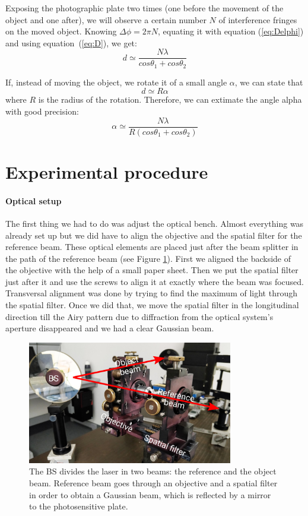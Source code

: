 \documentclass[11pt,a4paper]{article}
\begin{document}
Exposing the photographic plate two times (one before the movement of the object and one after), we will observe a certain number $N$ of interference fringes on the moved object. Knowing $\Delta \phi=2\pi N$, equating it with equation (\ref{eq:Delphi}) and using equation~(\ref{eq:D}), we get:
\begin{equation}
d\simeq\frac{N\lambda}{cos\theta_1+cos\theta_2}\label{eq:d}
\end{equation}

If, instead of moving the object, we rotate it of a small angle $\alpha$, we can state that
\begin{equation}
d\simeq R\alpha
\end{equation}
where $R$ is the radius of the rotation. Therefore, we can extimate the angle alpha with good precision:
\begin{equation}
\alpha\simeq \frac{N\lambda}{R(cos\theta_1+cos\theta_2)}\label{eq:alp}
\end{equation}
\section{Experimental procedure}
\paragraph{Optical setup}
The first thing we had to do was adjust the optical bench. Almost everything was already set up but we did have to align the objective and the spatial filter for the reference beam. These optical elements are placed just after the beam splitter in the path of the reference beam (see Figure \ref{fig:optical_bench_1}). First we aligned the backside of the objective with the help of a small paper sheet. Then we put the spatial filter just after it and use the screws to align it at exactly where the beam was focused. Transversal alignment was done by trying to find the maximum of light through the spatial filter. Once we did that, we move the spatial filter in the longitudinal direction till the Airy pattern due to diffraction from the optical system's aperture disappeared and we had a clear Gaussian beam.

\begin{figure}[ht]
\centering
\includegraphics[width=0.8\textwidth]{Optical_bench_1}
\caption{The BS divides the laser in two beams: the reference and the object beam. Reference beam goes through an objective and a spatial filter in order to obtain a Gaussian beam, which is reflected by a mirror to the photosensitive plate.}
\label{fig:optical_bench_1}
\end{figure}
\end{document}
